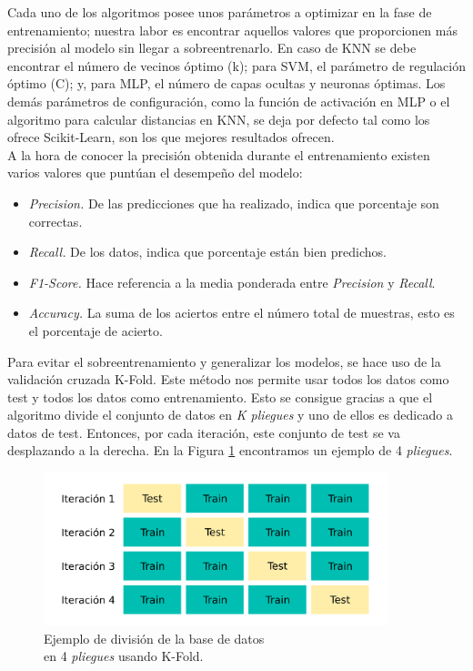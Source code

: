 Cada uno de los algoritmos posee unos parámetros a optimizar en la fase de entrenamiento; nuestra labor es encontrar aquellos valores que proporcionen más precisión al modelo sin llegar a sobreentrenarlo. En caso de KNN se debe encontrar el número de vecinos óptimo (k); para SVM, el parámetro de regulación óptimo (C); y, para MLP, el número de capas ocultas y neuronas óptimas. Los demás parámetros de configuración, como la función de activación en MLP o el algoritmo para calcular distancias en KNN, se deja por defecto tal como los ofrece Scikit-Learn, son los que mejores resultados ofrecen.\\

A la hora de conocer la precisión obtenida durante el entrenamiento existen varios valores que puntúan el desempeño del modelo:

\begin{itemize}
    \item \textit{Precision.} De las predicciones que ha realizado, indica que porcentaje son correctas.
    \item \textit{Recall.} De los datos, indica que porcentaje están bien predichos.
    \item \textit{F1-Score.} Hace referencia a la media ponderada entre \textit{Precision} y \textit{Recall}.
    \item \textit{Accuracy.} La suma de los aciertos entre el número total de muestras, esto es el porcentaje de acierto.\\
\end{itemize}

Para evitar el sobreentrenamiento y generalizar los modelos, se hace uso de la validación cruzada K-Fold. Este método nos permite usar todos los datos como test y todos los datos como entrenamiento. Esto se consigue gracias a que el algoritmo divide el conjunto de datos en \textit{K pliegues} y uno de ellos es dedicado a datos de test. Entonces, por cada iteración, este conjunto de test se va desplazando a la derecha. En la Figura \ref{fig:kfolf_explicacion} encontramos un ejemplo de 4 \textit{pliegues}.\\

\begin{figure} [h!]
  \begin{center}
    \includegraphics[width=10cm]{figs/KFold_explanation.png}
  \end{center}
  \captionsetup{justification=centering}
  \caption{Ejemplo de división de la base de datos \\
  en 4 \textit{pliegues} usando K-Fold.}
  \label{fig:kfolf_explicacion}
\end{figure}

